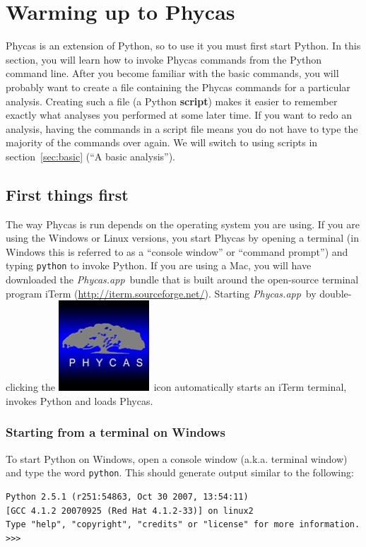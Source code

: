 \documentclass[10pt]{article}
\newcommand{\pathname}[1]{{\em #1}}			%
\newcommand{\code}[1]{{\tt #1}}				%
\newcommand{\term}[1]{{\bfseries #1}\index{#1}}		%
\newcommand{\phycasapp}{\pathname{Phycas.app}}
\newcommand{\phycasicon}{\includegraphics[scale=0.1]{images/PhycasGUI}}
\begin{document}
\section{Warming up to Phycas} \label{sec:warmup}

Phycas is an extension of Python, so to use it you must first start Python. In this section, you will learn how to invoke Phycas commands from the Python command line. After you become familiar with the basic commands, you will probably want to create a file containing the Phycas commands for a particular analysis. Creating such a file (a Python \term{script}) makes it easier to remember exactly what analyses you performed at some later time. If you want to redo an analysis, having the commands in a script file means you do not have to type the majority of the commands over again. We will switch to using scripts in section~\ref{sec:basic} (``A basic analysis'').

\subsection{First things first}
The way Phycas is run depends on the operating system you are using. If you are using the Windows or Linux versions, you start Phycas by opening a terminal (in Windows this is referred to as a ``console window'' or ``command prompt'') and typing \code{python} to invoke Python. If you are using a Mac, you will have downloaded the \phycasapp\ bundle that is built around the open-source terminal program iTerm (\url{http://iterm.sourceforge.net/}). Starting \phycasapp\ by double-clicking the \phycasicon\ icon automatically starts an iTerm terminal, invokes Python and loads Phycas.

\subsubsection{Starting from a terminal on Windows}
To start Python on Windows, open a console window (a.k.a. terminal window) and type the word \code{python}. This should generate output similar to the following:
\begin{verbatim}
Python 2.5.1 (r251:54863, Oct 30 2007, 13:54:11) 
[GCC 4.1.2 20070925 (Red Hat 4.1.2-33)] on linux2
Type "help", "copyright", "credits" or "license" for more information.
>>> 
\end{verbatim}
\end{document}
